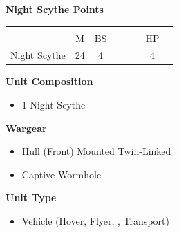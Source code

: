 \newpage
\subsubsection[Night Scythe]{}
\hspace{0.5em}
\begin{minipage}[t]{0.72\textwidth}
	{\large \textbf{Night Scythe  Points}}
	\begin{NiceTabular}{m{145 pt} *{2}{c} | *{3}{c} | c | c }
		& & &  & & & &  \\
		& M & BS &  &  &  & HP &  \\
		\hline
		Night Scythe & 24 & 4 &  &  &  & 4 & \\
	\end{NiceTabular}
	\small
	\begin{minipage}[t]{0.5\textwidth}
		\begin{flushleft}
			\vspace*{2em}
			\textbf{Unit Composition}
			\begin{itemize}
				\item 1 Night Scythe
			\end{itemize}
			
			\textbf{Wargear}
			\begin{itemize}
				\item Hull (Front) Mounted Twin-Linked 
				\item Captive Wormhole
			\end{itemize}
		\end{flushleft}
	\end{minipage}
	\begin{minipage}[t]{0.5\textwidth}
		\begin{flushleft}
			\vspace*{2em}
			\textbf{Unit Type}
			\begin{itemize}
				\item Vehicle (Hover, Flyer, , Transport)
			\end{itemize}
			

\end{flushleft}
\end{minipage}
\end{minipage}
